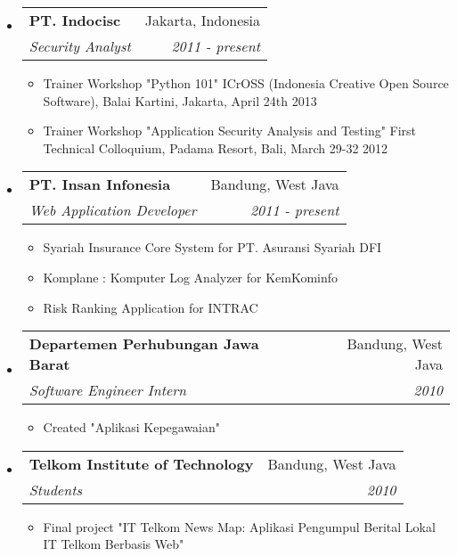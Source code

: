 \documentclass[letterpaper,11pt]{article}
\makeatletter
\newcommand{\resitem}[1]{\item #1 \vspace{-2pt}}
\newcommand{\ressubheading}[4]{

\begin{tabular*}{6.5in}{l@{\cftdotfill{\cftsecdotsep}\extracolsep{\fill}}r}

		\textbf{#1} & #2 \\

		\textit{#3} & \textit{#4} \\

\end{tabular*}\vspace{-6pt}}
\makeatother
\begin{document}
\begin{itemize}

\item

	\ressubheading{PT. Indocisc}{Jakarta, Indonesia}{Security Analyst}{2011 - present}

	\begin{itemize}

		\resitem{Trainer Workshop "Python 101" ICrOSS (Indonesia Creative Open Source Software), Balai Kartini, Jakarta, April 24th 2013}

		\resitem{Trainer Workshop "Application Security Analysis and Testing" First Technical Colloquium, Padama Resort, Bali, March 29-32 2012}

	\end{itemize}

\item

	\ressubheading{PT. Insan Infonesia}{Bandung, West Java}{Web Application Developer}{2011 - present}

	\begin{itemize}

		\resitem{Syariah Insurance Core System for PT. Asuransi Syariah DFI}

    	\resitem{Komplane : Komputer Log Analyzer for KemKominfo}

    	\resitem{Risk Ranking Application for INTRAC}

	\end{itemize}

\item

	\ressubheading{Departemen Perhubungan Jawa Barat}{Bandung, West Java}{Software Engineer Intern}{2010}

	\begin{itemize}

		\resitem{Created "Aplikasi Kepegawaian"}

	\end{itemize}

\item

	\ressubheading{Telkom Institute of Technology}{Bandung, West Java}{Students}{2010}

	\begin{itemize}

		\resitem{Final project "IT Telkom News Map: Aplikasi Pengumpul Berital Lokal IT Telkom Berbasis Web"}

	\end{itemize}


\end{itemize}
\end{document}
